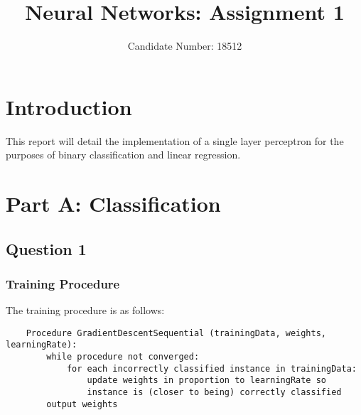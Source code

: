 \documentclass{article}
\title{Neural Networks: Assignment 1}
\author{Candidate Number: 18512}
\begin{document}
\maketitle

\section*{Introduction}
This report will detail the implementation of a single layer perceptron for the purposes of binary classification and linear regression.

\section*{Part A: Classification}
\subsection*{Question 1}
\subsubsection*{Training Procedure}
The training procedure is as follows:

\begin{verbatim}
    Procedure GradientDescentSequential (trainingData, weights, learningRate):
        while procedure not converged:
            for each incorrectly classified instance in trainingData:
                update weights in proportion to learningRate so
                instance is (closer to being) correctly classified
        output weights
\end{verbatim}
\end{document}
